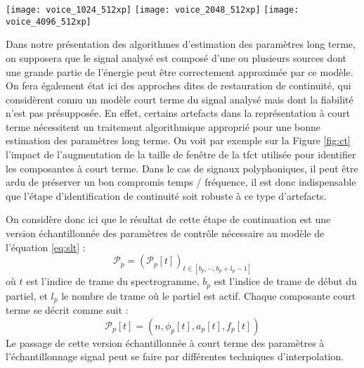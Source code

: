 \begin{figure*}[t]
  \texttt{[image: voice\_1024\_512xp]}
  \texttt{[image: voice\_2048\_512xp]}
  \texttt{[image: voice\_4096\_512xp]}
  \caption{Influence de la taille de fenêtre de la tfct utilisée pour estimer un modèle sinusoïdal à court terme. De gauche à droite, la taille est de 25, 50, et 100 ms, pour un pas d'avancement de 10 ms. Chaque point correspond  à une composante à court terme $p_{t, c}$ et sa taille est fonction de l'amplitude de la composante $a_{t, c}$.}
  \label{fig:ct}
\end{figure*}

Dans notre présentation des algorithmes d'estimation des paramètres long terme, on supposera que le signal analysé est composé d'une ou plusieurs sources dont une grande partie de l'énergie peut être correctement approximée par ce modèle. On fera également état ici des approches dites de \og restauration \fg de continuité, qui considèrent connu un modèle court terme du signal analysé mais dont la fiabilité n'est pas présupposée. En effet, certains artefacts dans la représentation à court terme nécessitent un traitement algorithmique approprié pour une bonne estimation des paramètres long terme. On voit par exemple sur la Figure \ref{fig:ct} l'impact de l'augmentation de la taille de fenêtre de la tfct utilisée pour identifier les composantes à court terme. Dans le cas de signaux polyphoniques, il peut être ardu de préserver un bon compromis temps / fréquence, il est donc indispensable que l'étape d'identification de continuité soit robuste à ce type d'artefacts.


On considère donc ici que le résultat de cette étape de continuation est une version échantillonnée des paramètres de contrôle nécessaire au modèle de l'équation \ref{eq:slt} :
\begin{equation}
\mathcal{P}_{p}=\left(\mathcal{P}_{p}[t]\right)_{t \in\left[b_{p}, \cdots, b_{p}+l_{p}-1\right]}
\end{equation}
où $t$ est l'indice de trame du spectrogramme, $b_{p}$ est l'indice de trame de début du partiel, et $l_{p}$ le nombre de trame où le partiel est actif. Chaque composante court terme se décrit comme suit :
\begin{equation}
\mathcal{P}_{p}[t]=\left(n, \phi_{p}[t], a_{p}[t], f_{p}[t]\right)
\end{equation}
Le passage de cette version échantillonnée à court terme des paramètres à l'échantillonnage signal peut se faire par différentes techniques d'interpolation.

